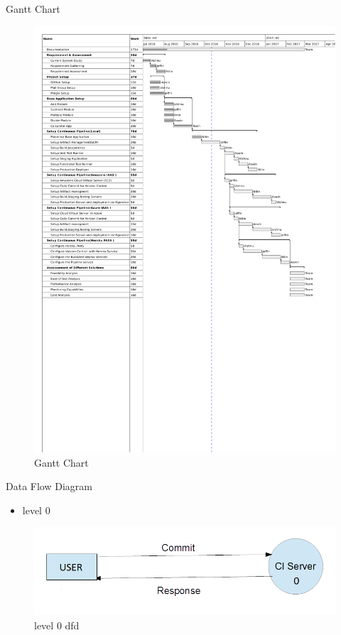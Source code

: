 \documentclass{beamer}
\begin{document}
\begin{frame}{Gantt Chart}
\begin{figure}[h]
\begin{center}
\includegraphics[scale=0.28]{LogicBakerGantt.pdf}
\caption{Gantt Chart}
\end{center}
\end{figure}
\end{frame}

\begin{frame}{Data Flow Diagram}
\begin{itemize}
\item level 0
\end{itemize}
\begin{figure}[h]
\begin{center}
\includegraphics[scale=0.28]{dfd1.png}
\caption{level 0 dfd}
\end{center}
\end{figure}
\end{frame}
\end{document}
